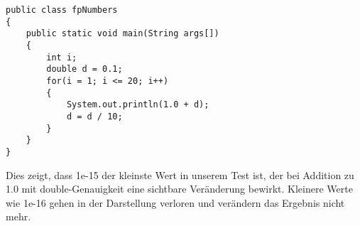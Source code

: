 \documentclass[10pt, oneside]{article}
\begin{document}
\begin{verbatim}
public class fpNumbers
{
    public static void main(String args[])
    {
        int i;
        double d = 0.1;
        for(i = 1; i <= 20; i++)
        {
            System.out.println(1.0 + d);
            d = d / 10;
        }
    }
}
\end{verbatim}

Dies zeigt, dass 1e-15 der kleinste Wert in unserem Test ist, der bei Addition
zu 1.0 mit double-Genauigkeit eine sichtbare Veränderung bewirkt. Kleinere
Werte wie 1e-16 gehen in der Darstellung verloren und verändern das Ergebnis
nicht mehr.
\end{document}
